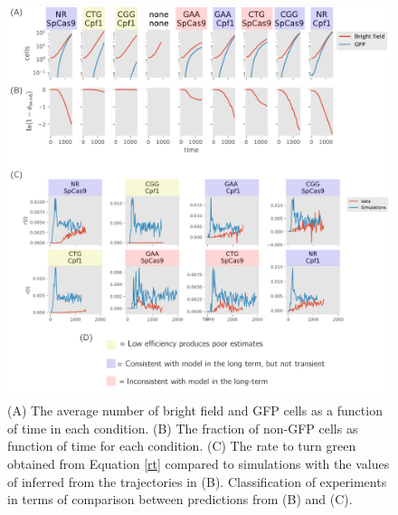\documentclass{article}
\begin{document}
\begin{figure}[h!]
\centering
\includegraphics[scale=0.6]{fig1.pdf}
\caption{(A) The average number of bright field and GFP cells as a function of time in each condition.  (B) The fraction of non-GFP cells as function of time for each condition.  (C) The rate to turn green obtained from Equation \ref{rt} compared to simulations with the values of inferred from the trajectories in (B). Classification of experiments in terms of comparison between predictions from (B) and (C). }\label{fig:1}
\end{figure}
\end{document}
